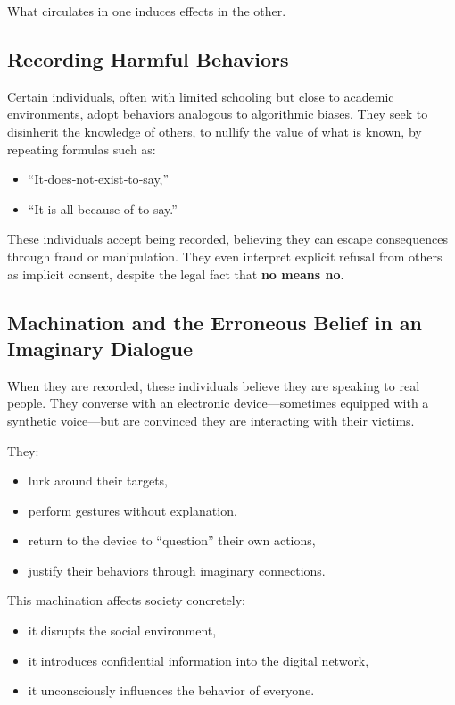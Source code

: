 \documentclass[12pt,oneside]{article}
\begin{document}
What circulates in one induces effects in the other.

\subsection{Recording Harmful Behaviors}

Certain individuals, often with limited schooling but close to academic environments, adopt behaviors analogous to algorithmic biases. They seek to disinherit the knowledge of others, to nullify the value of what is known, by repeating formulas such as:
\begin{itemize}
    \item “It‑does‑not‑exist‑to‑say,”
    \item “It‑is‑all‑because‑of‑to‑say.”
\end{itemize}

These individuals accept being recorded, believing they can escape consequences through fraud or manipulation. They even interpret explicit refusal from others as implicit consent, despite the legal fact that \textbf{no means no}.

\subsection{Machination and the Erroneous Belief in an Imaginary Dialogue}

When they are recorded, these individuals believe they are speaking to real people.  
They converse with an electronic device—sometimes equipped with a synthetic voice—but are convinced they are interacting with their victims.

They:
\begin{itemize}
    \item lurk around their targets,
    \item perform gestures without explanation,
    \item return to the device to “question” their own actions,
    \item justify their behaviors through imaginary connections.
\end{itemize}

This machination affects society concretely:
\begin{itemize}
    \item it disrupts the social environment,
    \item it introduces confidential information into the digital network,
    \item it unconsciously influences the behavior of everyone.
\end{itemize}
\end{document}
